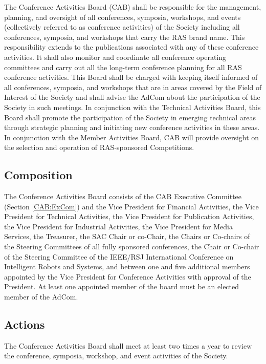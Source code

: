 \documentclass[10pt]{article}
\newcommand{\secref}[1]{Section \ref{#1}}
\begin{document}
The Conference Activities Board (CAB) shall be responsible for the management, planning, and oversight of all conferences, symposia, workshops, and events (collectively referred to as conference activities) of the Society including all conferences, symposia, and workshops that carry the RAS brand name.  This responsibility extends to the publications associated with any of these conference activities. It shall also monitor and coordinate all conference operating committees and carry out all the long-term conference planning for all RAS conference activities. This Board shall be charged with keeping itself informed of all conferences, symposia, and workshops that are in areas covered by the Field of Interest of the Society and shall advise the AdCom about the participation of the Society in such meetings. In conjunction with the Technical Activities Board, this Board shall promote the participation of the Society in emerging technical areas through strategic planning and initiating new conference activities in these areas. In conjunction with the Member Activities Board, CAB will provide oversight on the selection and operation of RAS-sponsored Competitions. 


\subsection{Composition}

The Conference Activities Board consists of the CAB Executive Committee (\secref{CAB:ExCom}) and the Vice President for Financial Activities, the Vice President for Technical Activities, the Vice President for Publication Activities,  the Vice President for Industrial Activities, the Vice President for Media Services, the Treasurer, the SAC Chair or co-Chair, the Chairs or Co-chairs of the Steering Committees of all fully sponsored conferences, the Chair or Co-chair of the Steering Committee of the IEEE/RSJ International Conference on Intelligent Robots and Systems, and between one and five additional members appointed by the Vice President for Conference Activities with approval of the President. At least one appointed member of the board must be an elected member of the AdCom.  

\subsection{Actions}

The Conference Activities Board shall meet at least two times a year to review the conference, symposia, workshop, and event activities of the Society.
\end{document}
